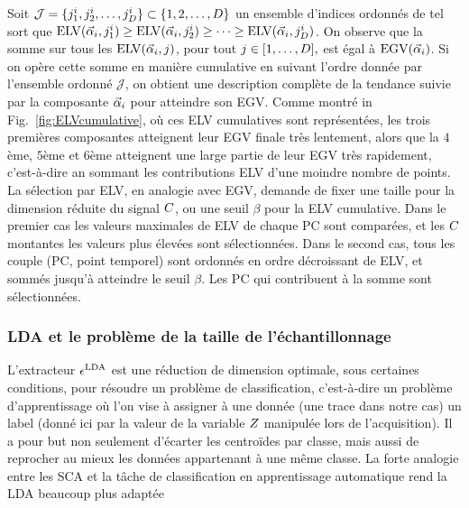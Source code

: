 Soit $\mathcal{J}=\{j^i_1, j^i_2, \dots, j^i_{D}\}\subset\{1,2,\dots,D\}$  un ensemble  d'indices ordonnés de tel sort que $\mathrm{ELV}(\vec{\alpha}_i,j^i_1)\geq \mathrm{ELV}(\vec{\alpha}_i,j^i_2)\geq \dots \geq \mathrm{ELV}(\vec{\alpha}_i,j^i_D)$. On observe que la somme sur tous les $\mathrm{ELV}(\vec{\alpha}_i,j)$, pour tout $j\in[1,\dots,D],$  est égal à $\mathrm{EGV}(\vec{\alpha}_i)$. Si on opère cette somme en manière cumulative en suivant l'ordre donnée par l'ensemble ordonné $\mathcal{J}$, on obtient une description complète de la tendance suivie par la composante $\vec{\alpha}_i$ pour atteindre son EGV. Comme montré in Fig.~\ref{fig:ELVcumulative}, où ces ELV cumulatives sont représentées, les trois premières composantes atteignent leur EGV finale très lentement, alors que la $4$ème, $5$ème et $6$ème atteignent une large partie de leur EGV très rapidement, c'est-à-dire an sommant les contributions ELV d'une moindre nombre de points. La sélection par ELV, en analogie avec EGV, demande de fixer une taille pour la dimension réduite du signal $C$, ou une seuil $\beta$ pour la ELV cumulative. Dans le premier cas les valeurs maximales de ELV de chaque PC sont comparées, et les $C$ montantes les valeurs plus élevées sont sélectionnées. Dans le second cas, tous les couple (PC, point temporel) sont ordonnés en ordre décroissant de ELV, et sommés jusqu'à atteindre le seuil $\beta$. Les PC qui contribuent à la somme sont sélectionnées.\\




\subsubsection{LDA et le probl\`{e}me de la taille de l'\'{e}chantillonnage}
L'extracteur $\epsilon^{\mathrm{LDA}}$ est une réduction de dimension optimale, sous certaines conditions, pour résoudre un problème de classification, c'est-à-dire un problème d'apprentissage où l'on vise à assigner à une donnée (une trace dans notre cas) un label (donné ici par la valeur de la variable $Z$ manipulée lors de l'acquisition). Il a pour but non seulement d'écarter les centro\"ides par classe, mais aussi de reprocher au mieux les données appartenant à une même classe. La forte analogie entre les SCA et la tâche de classification en apprentissage automatique rend la LDA beaucoup plus adaptée 

